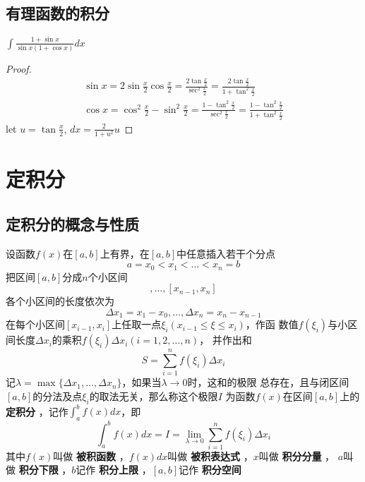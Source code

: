 \documentclass[11pt]{article}
\begin{document}
\subsection{有理函数的积分}
\label{sec:org45a50e2}
\begin{proposition}[]
\(\int\frac{1+\sin x}{\sin x(1+\cos x)}dx\)
\end{proposition}

\begin{proof}
\begin{gather*}
\sin x=2\sin \frac{x}{2}\cos\frac{x}{2}=\frac{2\tan\frac{x}{2}}{\sec^2\frac{x}{2}}=
\frac{2\tan\frac{x}{2}}{1+\tan^2\frac{x}{2}}\\
\cos x=\cos^2\frac{x}{2}-\sin^2\frac{x}{2}=\frac{1-\tan^2\frac{x}{2}}{\sec^2\frac{x}{2}}=
\frac{1-\tan^2\frac{x}{2}}{1+\tan^2\frac{x}{2}}
\end{gather*}
let \(u=\tan\frac{x}{2}\), \(dx=\frac{2}{1+u^2}u\)
\end{proof}
\section{定积分}
\label{sec:org66ca51d}
\subsection{定积分的概念与性质}
\label{sec:org60e432c}
\begin{definition}[]
设函数\(f(x)\)在\([a,b]\)上有界，在\([a,b]\)中任意插入若干个分点
\begin{equation*}
a=x_0<x_1<\dots<x_n=b
\end{equation*}
把区间\([a,b]\)分成\(n\)个小区间
\begin{equation*}
[x_0,x_1],\dots,[x_{n-1},x_n]
\end{equation*}
各个小区间的长度依次为
\begin{equation*}
\Delta x_1=x_1-x_0,\dots,\Delta x_n=x_n-x_{n-1}
\end{equation*}
在每个小区间\([x_{i-1},x_i]\)上任取一点\(\xi_i(x_{i-1}\le\xi\le x_i)\)，作函
数值\(f(\xi_i)\)与小区间长度\(\Delta x_i\)的乘积\(f(\xi_i)\Delta x_i(i=1,2,\dots,n)\)，
并作出和
\begin{equation*}
S=\sum_{i=1}^nf(\xi_i)\Delta x_i
\end{equation*}
记\(\lambda=\max\{\Delta x_1,\dots,\Delta x_n\}\)，如果当\(\lambda\to0\)时，这和的极限
总存在，且与闭区间\([a,b]\)的分法及点\(\xi_i\)的取法无关，那么称这个极限\(I\)
为函数\(f(x)\)在区间\([a,b]\)上的 \textbf{定积分} ，记作\(\int_a^bf(x)dx\)，即
\begin{equation*}
\int_a^bf(x)dx=I=\lim_{\lambda\to0}\sum_{i=1}^nf(\xi_i)\Delta x_i
\end{equation*}
其中\(f(x)\)叫做 \textbf{被积函数} ，\(f(x)dx\)叫做 \textbf{被积表达式} ，\(x\)叫做 \textbf{积分分量} ，
\(a\)叫做 \textbf{积分下限} ，\(b\)记作 \textbf{积分上限} ，\([a,b]\)记作 \textbf{积分空间}
\end{definition}
\end{document}
